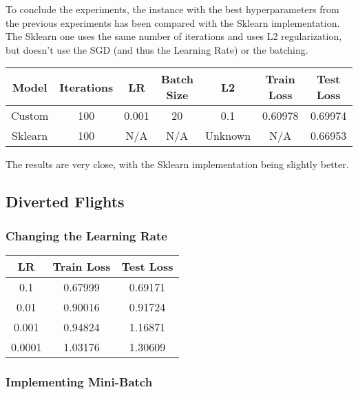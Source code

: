 \documentclass[
	letterpaper, %
	10pt, %
]{class}
\begin{document}
To conclude the experiments, the instance with the best hyperparameters from the previous experiments has been compared with the Sklearn implementation.\\

The Sklearn one uses the same number of iterations and uses L2 regularization, but doesn't use the SGD (and thus the Learning Rate) or the batching.

\begin{center}
	\begin{tabular}{ |c|c|c|c|c|c|c| }
		\hline
		Model   & Iterations & LR    & Batch Size & L2      & Train Loss & Test Loss \\
		\hline
		Custom  & 100        & 0.001 & 20         & 0.1     & 0.60978    & 0.69974   \\
		Sklearn & 100        & N/A   & N/A        & Unknown & N/A        & 0.66953   \\
		\hline
	\end{tabular}
\end{center}

The results are very close, with the Sklearn implementation being slightly better.

\subsection{Diverted Flights}

\subsubsection{Changing the Learning Rate}

\begin{center}
	\begin{tabular}{ |c|c|c| }
		\hline
		LR     & Train Loss & Test Loss \\
		\hline
		0.1    & 0.67999    & 0.69171   \\
		0.01   & 0.90016    & 0.91724   \\
		0.001  & 0.94824    & 1.16871   \\
		0.0001 & 1.03176    & 1.30609   \\
		\hline
	\end{tabular}
\end{center}

\subsubsection{Implementing Mini-Batch}
\end{document}

